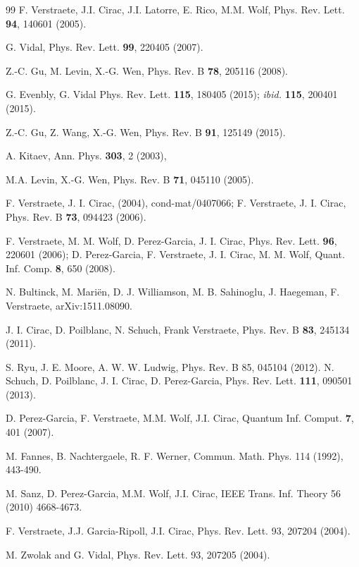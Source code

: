 \documentclass{elsarticle}
\begin{document}
\begin{thebibliography}{99}
F. Verstraete, J.I. Cirac, J.I. Latorre, E. Rico,  M.M. Wolf,
Phys. Rev. Lett. {\bf 94}, 140601 (2005).

G. Vidal,
Phys. Rev. Lett. {\bf 99}, 220405 (2007).

Z.-C. Gu, M. Levin,  X.-G. Wen,
Phys. Rev. B {\bf 78}, 205116 (2008).

G. Evenbly,  G. Vidal
Phys. Rev. Lett. {\bf 115}, 180405 (2015); {\it ibid.}
{\bf 115}, 200401 (2015).

Z.-C. Gu, Z. Wang,  X.-G. Wen,
Phys. Rev. B {\bf 91}, 125149 (2015).

A. Kitaev,
Ann. Phys. {\bf 303}, 2 (2003),

M.A. Levin, X.-G. Wen,
Phys. Rev. B {\bf 71}, 045110 (2005).

F. Verstraete, J. I. Cirac, (2004), cond-mat/0407066;
F. Verstraete, J. I. Cirac, Phys. Rev. B {\bf 73}, 094423
(2006).

F. Verstraete, M. M. Wolf, D. Perez-Garcia,  J. I. Cirac,
Phys. Rev. Lett. {\bf 96}, 220601 (2006);
D. Perez-Garcia, F. Verstraete, J. I. Cirac,  M. M. Wolf,
Quant. Inf. Comp. {\bf 8}, 650 (2008).


N. Bultinck, M. Mari\"en, D. J. Williamson, M. B. Sahinoglu, J. Haegeman,  F. Verstraete,
arXiv:1511.08090.

J. I. Cirac, D. Poilblanc, N. Schuch, Frank Verstraete,
Phys. Rev. B {\bf 83}, 245134 (2011).

S. Ryu, J. E. Moore, A. W. W. Ludwig, Phys. Rev. B 85, 045104 (2012).
N. Schuch, D. Poilblanc, J. I. Cirac,  D. Perez-Garcia,
Phys. Rev. Lett. {\bf 111}, 090501 (2013).

D. Perez-Garcia, F. Verstraete, M.M. Wolf,  J.I. Cirac,
Quantum Inf. Comput. {\bf 7}, 401 (2007).

M. Fannes, B. Nachtergaele, R. F. Werner,
Commun. Math. Phys. 114 (1992), 443-490.

M. Sanz, D. Perez-Garcia, M.M. Wolf, J.I. Cirac,
IEEE Trans. Inf. Theory 56 (2010) 4668-4673.

F. Verstraete, J.J. Garcia-Ripoll, J.I. Cirac,
Phys. Rev. Lett. 93, 207204 (2004).

M. Zwolak and G. Vidal,  Phys. Rev. Lett. 93, 207205 (2004).


\end{thebibliography}
\end{document}
